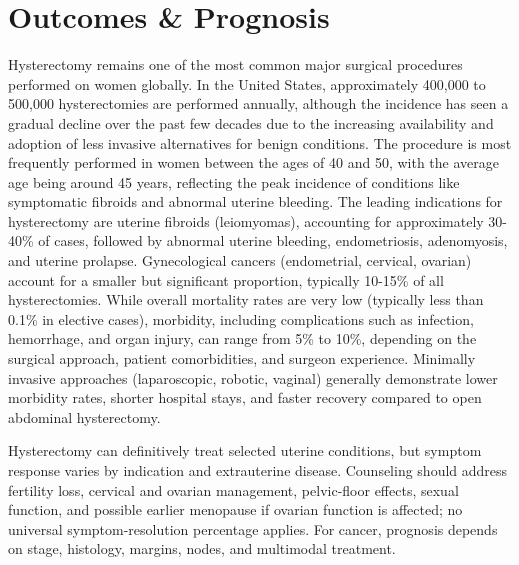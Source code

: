 \section*{Outcomes \& Prognosis}
Hysterectomy remains one of the most common major surgical procedures performed on women globally. In the United States, approximately 400,000 to 500,000 hysterectomies are performed annually, although the incidence has seen a gradual decline over the past few decades due to the increasing availability and adoption of less invasive alternatives for benign conditions. The procedure is most frequently performed in women between the ages of 40 and 50, with the average age being around 45 years, reflecting the peak incidence of conditions like symptomatic fibroids and abnormal uterine bleeding. The leading indications for hysterectomy are uterine fibroids (leiomyomas), accounting for approximately 30-40\% of cases, followed by abnormal uterine bleeding, endometriosis, adenomyosis, and uterine prolapse. Gynecological cancers (endometrial, cervical, ovarian) account for a smaller but significant proportion, typically 10-15\% of all hysterectomies. While overall mortality rates are very low (typically less than 0.1\% in elective cases), morbidity, including complications such as infection, hemorrhage, and organ injury, can range from 5\% to 10\%, depending on the surgical approach, patient comorbidities, and surgeon experience. Minimally invasive approaches (laparoscopic, robotic, vaginal) generally demonstrate lower morbidity rates, shorter hospital stays, and faster recovery compared to open abdominal hysterectomy.

Hysterectomy can definitively treat selected uterine conditions, but symptom response varies by indication and extrauterine disease. Counseling should address fertility loss, cervical and ovarian management, pelvic-floor effects, sexual function, and possible earlier menopause if ovarian function is affected; no universal symptom-resolution percentage applies. For cancer, prognosis depends on stage, histology, margins, nodes, and multimodal treatment.

